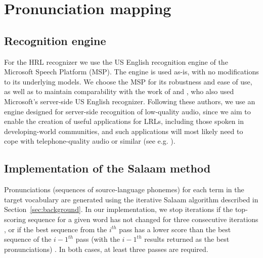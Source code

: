 \documentclass[11pt]{article}
\begin{document}


\section{Pronunciation mapping}
\label{sec:backend}

\subsection{Recognition engine}
\label{sec:engine}
For the HRL recognizer
we use the US English recognition engine 
of the Microsoft Speech Platform (MSP).
The engine is used as-is, with no modifications to its underlying models. 
We choose the MSP for its robustness and ease of use, as well as to maintain comparability with the work of  and , who also used Microsoft's server-side US English recognizer. 
Following these authors, we use an engine designed for server-side recognition of low-quality audio, since we aim to enable the creation of useful applications for LRLs, including those spoken in developing-world communities, and such applications will most likely need to cope with telephone-quality audio or similar (see e.g. ).



\subsection{Implementation of the Salaam method}
\label{sec:implementation}

Pronunciations (sequences of source-language phonemes) for each term in the target vocabulary are generated using the iterative Salaam algorithm %
described in Section~\ref{sec:background}. In our implementation, 
we stop iterations
if the top-scoring sequence for a given word has not changed for three consecutive iterations \cite{Chan12}, or 
if the best sequence from the $i^{th}$ pass has a lower score than the best sequence of the ${i - 1}^{th}$ pass (with the ${i - 1}^{th}$ results returned as the best pronunciations) \cite{Qiao10}. In both cases, at least three passes are required. 
\end{document}
